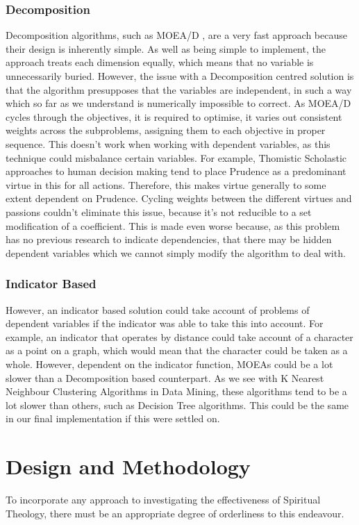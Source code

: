 \documentclass[11pt]{article}
\begin{document}
\subsubsection{Decomposition}
Decomposition algorithms, such as MOEA/D \cite{MOEAD}, are a very fast approach because their design is inherently simple. As well as being simple to implement, the approach treats each dimension equally, which means that no variable is unnecessarily buried. However, the issue with a Decomposition centred solution is that the algorithm presupposes that the variables are independent, in such a way which so far as we understand is numerically impossible to correct. As MOEA/D cycles through the objectives, it is required to optimise, it varies out consistent weights across the subproblems, assigning them to each objective in proper sequence. This doesn't work when working with dependent variables, as this technique could misbalance certain variables. For example, Thomistic Scholastic approaches to human decision making tend to place Prudence as a predominant virtue in this for all actions. Therefore, this makes virtue generally to some extent dependent on Prudence. Cycling weights between the different virtues and passions couldn't eliminate this issue, because it's not reducible to a set modification of a coefficient. This is made even worse because, as this problem has no previous research to indicate dependencies, that there may be hidden dependent variables which we cannot simply modify the algorithm to deal with.\\
\subsubsection{Indicator Based} 
However, an indicator based solution could take account of problems of dependent variables if the indicator was able to take this into account. For example, an indicator that operates by distance could take account of a character as a point on a graph, which would mean that the character could be taken as a whole. However, dependent on the indicator function, MOEAs could be a lot slower than a Decomposition based counterpart. As we see with K Nearest Neighbour Clustering Algorithms in Data Mining\cite{CompareML}, these algorithms tend to be a lot slower than others, such as Decision Tree algorithms. This could be the same in our final implementation if this were settled on.\\
\section{Design and Methodology}
To incorporate any approach to investigating the effectiveness of Spiritual Theology, there must be an appropriate degree of orderliness to this endeavour.\\
\end{document}
